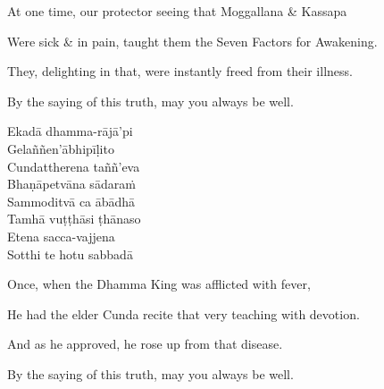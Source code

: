 \begin{english-verses}
\begin{english-hang-first-line}
  At one time, our protector seeing that Moggallana \& Kassapa\\
\end{english-hang-first-line}
\begin{english-hang-together-verses}
  Were sick \& in pain, taught them the Seven Factors for Awakening.\\
\end{english-hang-together-verses}
\begin{english-hang-together-verses}
  They, delighting in that, were instantly freed from their illness.\\
\end{english-hang-together-verses}
\begin{english-hang-together-verses}
  By the saying of this truth, may you always be well.
\end{english-hang-together-verses}
\end{english-verses}

\ifninebythirteen\clearpage\fi

\begin{pali-hang-continued}
  Ekadā dhamma-rājā'pi\\
  Gelaññen'ābhipīḷito\\
  Cundattherena taññ'eva\\
  Bhaṇāpetvāna sādaraṁ\\
  Sammoditvā ca ābādhā\\
  Tamhā vuṭṭhāsi ṭhānaso\\
  Etena sacca-vajjena\\
  Sotthi te hotu sabbadā
\end{pali-hang-continued}

\begin{english-verses}
\begin{english-hang-first-line}
  Once, when the Dhamma King was afflicted with fever,\\
\end{english-hang-first-line}
\begin{english-hang-together-verses}
  He had the elder Cunda recite that very teaching with devotion.\\
\end{english-hang-together-verses}
\begin{english-hang-together-verses}
  And as he approved, he rose up from that disease.\\
\end{english-hang-together-verses}
\begin{english-hang-together-verses}
  By the saying of this truth, may you always be well.
\end{english-hang-together-verses}
\end{english-verses}

